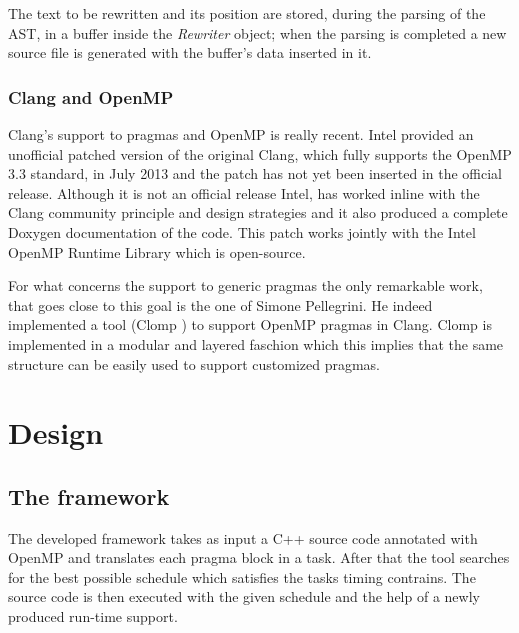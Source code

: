 \documentclass[a4paper,12pt,oneside]{book}
\begin{document}
The text to be rewritten and its position are stored, during the parsing of the AST, in a buffer inside the \emph{Rewriter} object; when the parsing is completed a new source file is generated with the buffer’s data inserted in it.  

\subsection{Clang and OpenMP}
Clang’s support to pragmas and OpenMP is really recent. Intel provided an unofficial patched version of the original Clang, which fully supports the OpenMP 3.3 standard, in July 2013 and the patch has not yet been inserted in the official release. Although it is not an official release Intel, has worked inline with the Clang community principle and design strategies and it also produced a complete Doxygen documentation of the code. This patch works jointly with the Intel OpenMP Runtime Library \cite{intelomprtl} which is open-source. 

For what concerns the support to generic pragmas the only remarkable work, that goes close to this goal is the one of Simone Pellegrini. He indeed implemented a tool (Clomp \cite{clomp}) to support OpenMP pragmas in Clang. Clomp is implemented in a modular and layered faschion which this implies that the same structure can be easily used to support customized pragmas.
 



\chapter{Design}
\section{The framework}

The developed framework takes as input a C++ source code annotated with OpenMP and translates each pragma block in a task. After that the tool searches for the best possible schedule which satisfies the tasks timing contrains. The source code is then executed with the given schedule and the help of a newly produced run-time support.
\end{document}
